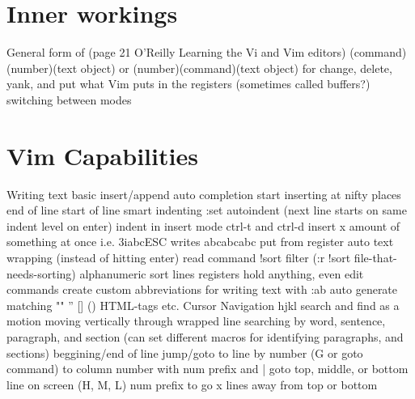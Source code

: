 \documentclass[12pt]{book}
\begin{document}
\section{Inner workings}
General form of (page 21 O'Reilly Learning the Vi and Vim editors) (command)(number)(text object) or (number)(command)(text object) for change, delete, yank, and put
what Vim puts in the registers (sometimes called buffers?)
switching between modes

\section{Vim Capabilities}
Writing text
  basic insert/append
  auto completion
  start inserting at nifty places 
    end of line
    start of line
    smart indenting
      :set autoindent (next line starts on same indent level on enter)
      indent in insert mode ctrl-t and ctrl-d
  insert x amount of something at once i.e. 3iabcESC writes abcabcabc
  put from register
  auto text wrapping (instead of hitting enter)
  read command
    !sort filter (:r !sort file-that-needs-sorting)
  alphanumeric sort lines
  registers hold anything, even edit commands 
  create custom abbreviations for writing text with :ab
  auto generate matching "" '' [] {} () HTML-tags etc.
Cursor Navigation 
  hjkl
  search and find as a motion
  moving vertically through wrapped line
  searching
  by word, sentence, paragraph, and section (can set different macros for identifying paragraphs, and sections)
  beggining/end of line
  jump/goto 
    to line by number (G or goto command)
    to column number with num prefix and |
    goto top, middle, or bottom line on screen (H, M, L) num prefix to go x lines away from top or bottom
\end{document}
